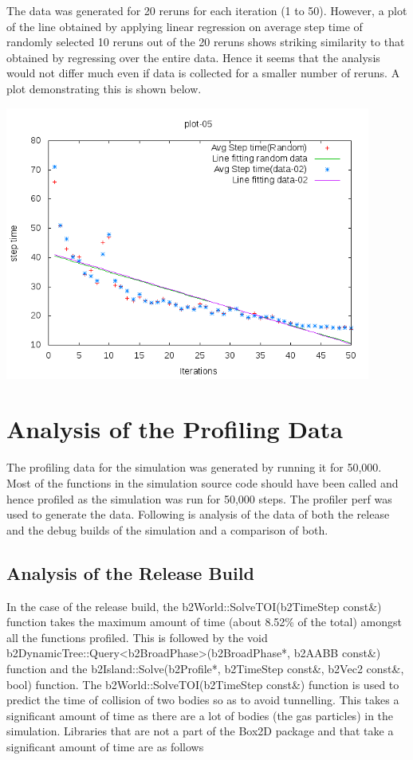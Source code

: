 \documentclass[11pt]{article}
\begin{document}
\indent The data was generated for 20 reruns for each iteration (1 to 50). However, a plot of the line obtained by applying linear regression on  average step time of randomly selected 10 reruns out of the 20 reruns shows striking similarity to that obtained by regressing over the entire data. Hence it seems that the analysis would not differ much even if data is collected for a smaller number of reruns. A plot demonstrating this is shown below.

\begin{center}
	\includegraphics[width=12cm]{./images/plots/g04_plot05.png}
\end{center}

\section{Analysis of the Profiling Data}
The profiling data for the simulation was generated by running it for 50,000. Most of the functions in the simulation source code should have been called and hence profiled as the simulation was run for 50,000 steps. The profiler perf\cite{perfsite} was used to generate the data. Following is analysis of the data of both the release and the debug builds of the simulation and a comparison of both.

\subsection{Analysis of the Release Build}
 In the case of the release build, the b2World::SolveTOI(b2TimeStep const\&) function takes the maximum amount of time (about 8.52\% of the total) amongst all the functions profiled. This is followed by the void b2DynamicTree::Query<b2BroadPhase>(b2BroadPhase*, b2AABB const\&) function and the b2Island::Solve(b2Profile*, b2TimeStep const\&, b2Vec2 const\&, bool) function. The b2World::SolveTOI(b2TimeStep const\&) function is used to predict the time of collision of two bodies so as to avoid tunnelling\cite{solveTOI}. This takes a significant amount of time as there are a lot of bodies (the gas particles) in the simulation. Libraries that are not a part of the Box2D package and that take a significant amount of time are as follows
\end{document}
